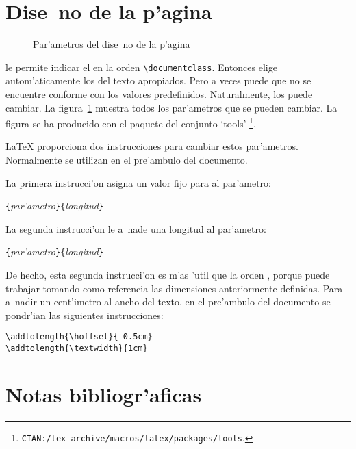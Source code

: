 \section{Dise~no de la p'agina}

\begin{figure}[!hp]
\begin{center}
\makeatletter
\lay@layout
\makeatother
\end{center}
\vspace*{1.8cm}
\caption{Par'ametros del dise~no de la p'agina}
\label{fig:layout}
\end{figure}

\LaTeXe{} le permite indicar el  en la orden
\verb|\documentclass|. Entonces elige autom'aticamente los
 del texto apropiados. Pero a veces puede que no se
encuentre conforme con los valores predefinidos. Naturalmente, los
puede cambiar.
\thispagestyle{fancyplain}%
La figura~\ref{fig:layout} muestra todos los par'ametros que se pueden
cambiar. La figura se ha producido con el paquete  del
conjunto `tools'
\footnote{\texttt{CTAN:/tex-archive/macros/latex/packages/tools}.}.

\LaTeX{} proporciona dos instrucciones para cambiar estos
 par'ametros. Normalmente se utilizan en el pre'ambulo del documento.

La primera instrucci'on asigna un valor fijo para al par'ametro:
\begin{command}
\verb|{|\emph{par'ametro}\verb|}{|\emph{longitud}\verb|}|
\end{command}

La segunda instrucci'on le a~nade una longitud al par'ametro:
\begin{command}
\verb|{|\emph{par'ametro}\verb|}{|\emph{longitud}\verb|}|
\end{command} 

De hecho, esta segunda instrucci'on es m'as 'util que la orden
, porque puede trabajar tomando como referencia las
dimensiones anteriormente definidas. Para a~nadir un cent'imetro al
ancho del texto, en el pre'ambulo del documento se pondr'ian las
siguientes instrucciones:
\begin{code}
\verb|\addtolength{\hoffset}{-0.5cm}|\\
\verb|\addtolength{\textwidth}{1cm}|
\end{code}

\section{Notas bibliogr'aficas}

